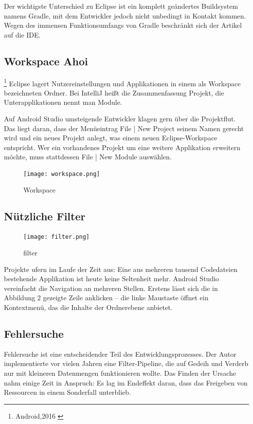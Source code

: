 Der wichtigste Unterschied zu Eclipse ist ein komplett geändertes Buildsystem namens Gradle, mit dem Entwickler jedoch nicht unbedingt in Kontakt kommen. Wegen des immensen Funktionsumfangs von Gradle beschränkt sich der Artikel auf die IDE.

\subsection{Workspace Ahoi}
\footnote{Android,2016 \cite{Android2016}}
Eclipse lagert Nutzereinstellungen und Applikationen in einem als Workspace bezeichneten Ordner. Bei IntelliJ heißt die Zusammenfassung Projekt, die Unterapplikationen nennt man Module.

Auf Android Studio umsteigende Entwickler klagen gern über die Projektflut. Das liegt daran, dass der Menüeintrag File | New Project seinem Namen gerecht wird und ein neues Projekt anlegt, was einem neuen Eclipse-Workspace entspricht. Wer ein vorhandenes Projekt um eine weitere Applikation erweitern möchte, muss stattdessen File | New Module auswählen.

\begin{figure}[!h]
  \texttt{[image: workspace.png]}
  \caption{Workspace}
  \label{fig:workspace}
\end{figure}

\subsection{Nützliche Filter}
\begin{figure}[!h]
  \texttt{[image: filter.png]}
  \caption{filter}
  \label{fig:filter}
\end{figure}

 Projekte ufern im Laufe der Zeit aus: Eine aus mehreren tausend Codedateien bestehende Applikation ist heute keine Seltenheit mehr. Android Studio vereinfacht die Navigation an mehreren Stellen. Erstens lässt sich die in Abbildung 2 gezeigte Zeile anklicken – die linke Maustaste öffnet ein Kontextmenü, das die Inhalte der Ordnerebene anbietet.

\subsection{Fehlersuche}
Fehlersuche ist eine entscheidender Teil des Entwicklungsprozesses. Der Autor implementierte vor vielen Jahren eine Filter-Pipeline, die auf Gedeih und Verderb nur mit kleineren Datenmengen funktionieren wollte. Das Finden der Ursache nahm einige Zeit in Anspruch: Es lag im Endeffekt daran, dass das Freigeben von Ressourcen in einem Sonderfall unterblieb.

